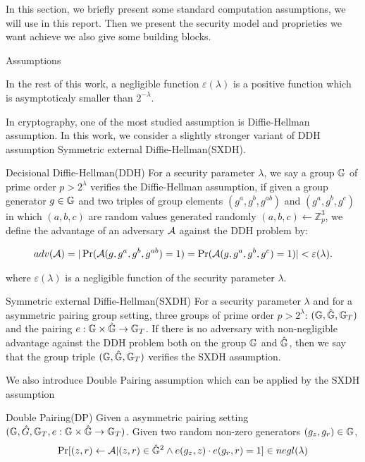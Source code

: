In this section, we briefly present some standard computation assumptions, we will use in this report.  
Then we present the security model and proprieties we want achieve we also give some building blocks.

\begin{subsection}{Assumptions}

  In the rest of this work, a negligible function $\varepsilon(\lambda)$ is a positive function which is asymptoticaly smaller than $2^{-\lambda}$.
  
  In cryptography, one of the most studied assumption is Diffie-Hellman assumption. In this work, we consider a slightly stronger variant of DDH assumption Symmetric external Diffie-Hellman(SXDH).

  \begin{myDef}{Decisional Diffie-Hellman(DDH)}
    For a security parameter $\lambda$, we say a group $\mathbb{G}$ of prime order $p>2^{\lambda}$ verifies the Diffie-Hellman assumption, if given a group generator $g \in \mathbb{G}$ and two triples of group elements $(g^a, g^b, g^{ab})$ and $(g^a, g^b, g^c)$ in which $(a, b, c)$ are random values generated randomly $(a, b, c) \gets \mathbb{Z}_p^3$, we define the advantage of an adversary $\mathcal{A}$ against the DDH problem by:

    \begin{align*}
      adv(\mathcal{A}) = |\operatorname{Pr}(\mathcal{A}(g, g^a, g^b, g^{ab}) = 1) = \operatorname{Pr}(\mathcal{A}(g, g^a, g^b, g^c) = 1)| < \varepsilon(\lambda).
    \end{align*}

    where $\varepsilon(\lambda)$ is a negligible function of the security parameter $\lambda$.
  \end{myDef}

  \begin{myDef}{Symmetric external Diffie-Hellman(SXDH)}
    For a security parameter $\lambda$ and for a asymmetric pairing group setting, three groups of prime order $p>2^\lambda$: $(\mathbb{G}, \hat{\mathbb{G}}, \mathbb{G}_T)$ and the pairing $e: \mathbb{G} \times \hat{\mathbb{G}} \to \mathbb{G}_T$. If there is no adversary with non-negligible advantage against the DDH problem both on the group $\mathbb{G}$ and $\hat{\mathbb{G}}$, then we say that the group triple $(\mathbb{G}, \hat{\mathbb{G}}, \mathbb{G}_T)$ verifies the SXDH assumption.
  \end{myDef}

  We also introduce Double Pairing assumption which can be applied by the SXDH assumption
  
  \begin{myDef}{Double Pairing(DP)}
    Given a asymmetric pairing setting $(\mathbb{G}, \hat{G}, \mathbb{G}_T, e:\mathbb{G} \times \hat{\mathbb{G}} \to \mathbb{G}_T)$. Given two random non-zero generators $(g_z, g_r) \in \mathbb{G}$,
    \begin{align*}
      \operatorname{Pr}[(z, r) \gets \mathcal{A}| (z, r)\in \hat{\mathbb{G}}^2 \wedge e(g_z, z) \cdot e(g_r, r) = 1] \in negl(\lambda)
    \end{align*}
  \end{myDef}


\end{subsection}
